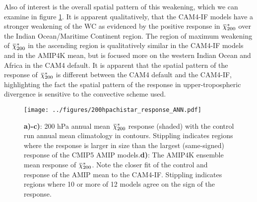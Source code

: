 \documentclass[letterpaper,12pt,titlepage,oneside,final]{book}
\newcommand{\overbar}[1]{\mkern 1.5mu\overline{\mkern-1.5mu#1\mkern-1.5mu}\mkern 1.5mu}
\begin{document}
Also of interest is the overall spatial pattern of this weakening, which we can examine in figure \ref{fig:chi200response}. It is apparent qualitatively, that the CAM4-IF models have a stronger weakening of the WC as evidenced by the positive response in $\overbar{\chi}_{200}^{*}$ over the Indian Ocean/Maritime Continent region. The region of maximum weakening of $\overbar{\chi}_{200}^{*}$ in the ascending region is qualitatively similar in the CAM4-IF models and in the AMIP4K mean, but is focused more on the western Indian Ocean and Africa in the CAM4 default. It is apparent that the spatial pattern of the response of $\overbar{\chi}_{200}^{*}$ is different between the CAM4 default and the CAM4-IF, highlighting the fact the spatial pattern of the response in upper-tropospheric divergence is sensitive to the convective scheme used.
\begin{figure}[H]
\centering
\noindent\texttt{[image: ../figures/200hpachistar\_response\_ANN.pdf]}\hfill
\caption{\footnotesize \footnotesize \textbf{a)-c)}: 200 hPa annual mean $\overbar{\chi}^{*}_{200}$ response (shaded) with the control run annual mean climatology in contours. Stippling indicates regions where the response is larger in size than the largest (same-signed) response of the CMIP5 AMIP models.\textbf{d)}: The AMIP4K ensemble mean response of $\overbar{\chi}^{*}_{200}$. Note the closer fit of the control and response of the AMIP mean to the CAM4-IF. Stippling indicates regions where 10 or more of 12 models agree on the sign of the response.}
\label{fig:chi200response}
\end{figure}

\end{document}
